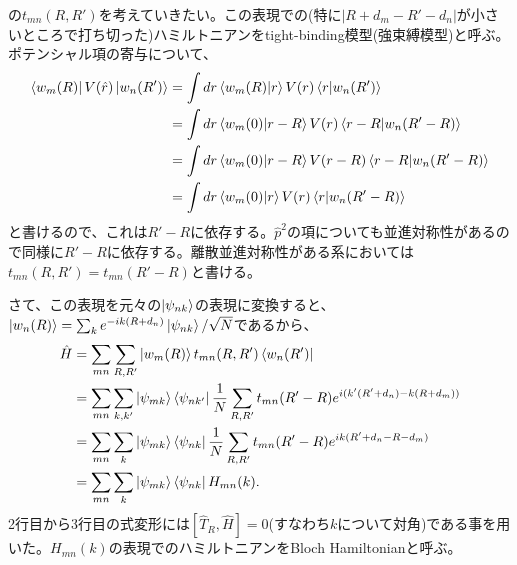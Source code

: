 \documentclass[a4paper,12pt]{jsarticle}
\begin{document}
の$t_{mn}(R,R')$を考えていきたい。この表現での(特に$|R+d_m-R'-d_n|$が小さいところで打ち切った)ハミルトニアンをtight-binding模型(強束縛模型)と呼ぶ。
ポテンシャル項の寄与について、
\begin{align}
  \bra{w_m(R)}V(\hat{r})\ket{w_n(R')} &= \int dr \braket{w_m(R)}{r}V(r)\braket{r}{w_n(R')}\\
  &=\int dr \braket{w_m(0)}{r-R}V(r)\braket{r-R}{w_n(R'-R)}\\
  &=\int dr \braket{w_m(0)}{r-R}V(r-R)\braket{r-R}{w_n(R'-R)}\\
  &=\int dr \braket{w_m(0)}{r}V(r)\braket{r}{w_n(R'-R)}
\end{align}
と書けるので、これは$R'-R$に依存する。$\hat{p}^2$の項についても並進対称性があるので同様に$R'-R$に依存する。離散並進対称性がある系においては$t_{mn}(R,R') = t_{mn}(R'-R)$と書ける。

さて、この表現を元々の$\ket{\psi_{nk}}$の表現に変換すると、$\ket{w_n(R)} = \sum_k e^{-ik(R+d_n)}\ket{\psi_{nk}}/\sqrt{N}$であるから、
\begin{align}
  \hat{H} &= \sum_{mn}\sum_{R,R'}\ket{w_m(R)}t_{mn}(R, R')\bra{w_n(R')}\\
  &= \sum_{mn}\sum_{k,k'}\ket{\psi_{mk}}\bra{\psi_{nk'}}\frac{1}{N}\sum_{R,R'}t_{mn}(R'- R)e^{i(k'(R'+d_n)-k(R+d_m))}\\
   &= \sum_{mn}\sum_{k}\ket{\psi_{mk}}\bra{\psi_{nk}}\frac{1}{N}\sum_{R,R'}t_{mn}(R'- R)e^{ik(R'+d_n-R-d_m)}\\
   & = \sum_{mn}\sum_{k}\ket{\psi_{mk}}\bra{\psi_{nk}} H_{mn}(k).
\end{align}
2行目から3行目の式変形には$[\hat{T}_R,\hat{H}]=0$(すなわち$k$について対角)である事を用いた。$H_{mn}(k)$の表現でのハミルトニアンをBloch Hamiltonianと呼ぶ。
\end{document}

